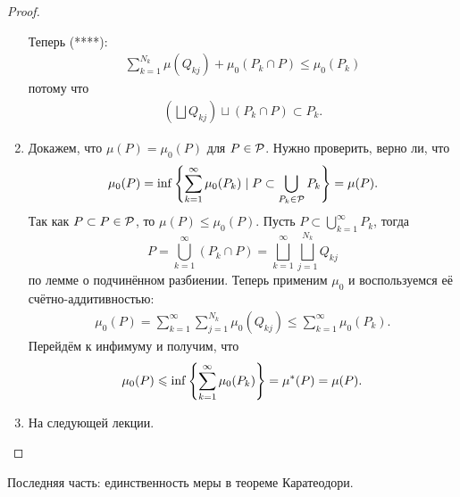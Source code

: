 \documentclass[a4paper,14pt]{extarticle}
\theoremstyle{definition}
\theoremstyle{plain}
\theoremstyle{plain}
\theoremstyle{plain}
\theoremstyle{plain}
\theoremstyle{definition}
\theoremstyle{definition}
\theoremstyle{definition}
\theoremstyle{definition}
\theoremstyle{definition}
\theoremstyle{definition}
\theoremstyle{plain}
\theoremstyle{plain}
\theoremstyle{plain}
\theoremstyle{plain}
\theoremstyle{definition}
\theoremstyle{definition}
\theoremstyle{definition}
\theoremstyle{definition}
\theoremstyle{definition}
\newcommand{\p}{\ensuremath \mathcal{P}}
\newcommand{\mua}{\ensuremath \mu^\ast}
\begin{document}
\begin{proof}
\begin{enumerate}
  Теперь (****):
  \begin{align*}
   \sum_{k=1}^{N_k}  \mu(Q_{kj}) + \mu_0(P_k \cap P) \leqslant \mu_0(P_k)
  \end{align*} потому что
  \begin{align*}
   \left( \bigsqcup Q_{kj} \right) \sqcup \left( P_k \cap P \right) \subset P_k
   .\end{align*}
  \item Докажем, что $ \mu(P) = \mu_0(P) $ для $ P \in \p $. Нужно проверить, верно ли, что
  \begin{align*}
   \mu_0(P) = \inf \left\{ \sum_{k=1}^{\infty} \mu_0(P_k) \mid P \subset \bigcup_{P_k \in \p} P_k \right\} = \mu(P)
   .\end{align*} Так как $ P \subset P \in \p $, то $ \mu(P) \leqslant \mu_0(P) $. Пусть $ P \subset \displaystyle\bigcup_{k=1}^\infty P_k $, тогда $$
   P = \bigcup_{k=1}^\infty (P_k \cap P) = \bigsqcup_{k=1}^\infty \bigsqcup_{j=1}^{N_k} Q_{kj}
  $$ по лемме о подчинённом разбиении. Теперь применим $ \mu_0 $ и воспользуемся её счётно-аддитивностью:
  \begin{align*}
   \mu_0(P) = \sum_{k=1}^{\infty} \sum_{j=1}^{N_k} \mu_0(Q_{kj}) \leqslant \sum_{k=1}^{\infty} \mu_0(P_k)
   .\end{align*} Перейдём к инфимуму и получим, что
  \begin{align*}
   \mu_0(P) \leqslant \inf \left\{ \sum_{k=1}^{\infty} \mu_0(P_k) \right\}  = \mua(P) = \mu(P)
   .\end{align*}
  \item На следующей лекции.
 \end{enumerate}
\end{proof}


Последняя часть: единственность меры в теореме Каратеодори.
\end{document}
